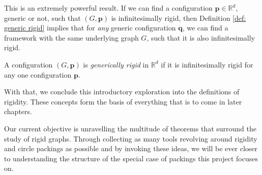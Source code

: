 \begin{flushleft}
This is an extremely powerful result. If we can find a configuration $\mathbf{p} \in \mathbb{R}^d$, generic or not, such that $(G,\mathbf{p})$ is infinitesimally rigid, then Definition \ref{def: generic rigid} implies that for \textit{any} generic configuration $\mathbf{q}$, we can find a framework with the same underlying graph $G$, such that it is also infinitesimally rigid.
\end{flushleft}

\begin{definition}
A configuration $(G,\mathbf{p})$ is \textit{generically rigid} in $\mathbb{R}^d$ if it is infinitesimally rigid for any one configuration $\mathbf{p}$.
\end{definition}

\begin{flushleft}
With that, we conclude this introductory exploration into the definitions of rigidity. These concepts form the basis of everything that is to come in later chapters. 
\end{flushleft}

\begin{flushleft}
Our current objective is unravelling the multitude of theorems that surround the study of rigid graphs. Through collecting as many tools revolving around rigidity and circle packings as possible and by invoking these ideas, we will be ever closer to understanding the structure of the special case of packings this project focuses on.
\end{flushleft}